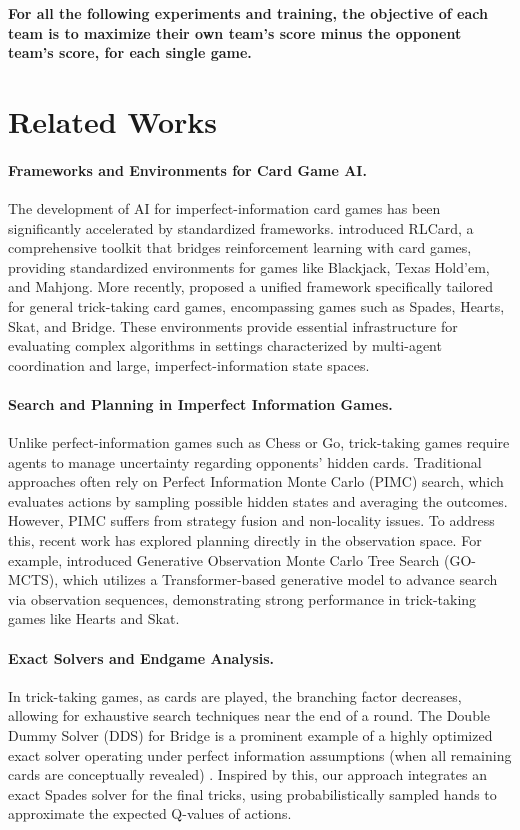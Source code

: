 \documentclass{article}
\begin{document}
\textbf{For all the following experiments and training, the objective of each team is to maximize their own team's score minus the opponent team's score, for each single game.}

\section{Related Works}

\paragraph{Frameworks and Environments for Card Game AI.} 
The development of AI for imperfect-information card games has been significantly accelerated by standardized frameworks. \citet{zha2019rlcard} introduced RLCard, a comprehensive toolkit that bridges reinforcement learning with card games, providing standardized environments for games like Blackjack, Texas Hold'em, and Mahjong. More recently, \citet{edelkamp2024framework} proposed a unified framework specifically tailored for general trick-taking card games, encompassing games such as Spades, Hearts, Skat, and Bridge. These environments provide essential infrastructure for evaluating complex algorithms in settings characterized by multi-agent coordination and large, imperfect-information state spaces.

\paragraph{Search and Planning in Imperfect Information Games.} 
Unlike perfect-information games such as Chess or Go, trick-taking games require agents to manage uncertainty regarding opponents' hidden cards. Traditional approaches often rely on Perfect Information Monte Carlo (PIMC) search, which evaluates actions by sampling possible hidden states and averaging the outcomes. However, PIMC suffers from strategy fusion and non-locality issues. To address this, recent work has explored planning directly in the observation space. For example, \citet{gottwald2024transformer} introduced Generative Observation Monte Carlo Tree Search (GO-MCTS), which utilizes a Transformer-based generative model to advance search via observation sequences, demonstrating strong performance in trick-taking games like Hearts and Skat. %

\paragraph{Exact Solvers and Endgame Analysis.} 
In trick-taking games, as cards are played, the branching factor decreases, allowing for exhaustive search techniques near the end of a round. The Double Dummy Solver (DDS) for Bridge is a prominent example of a highly optimized exact solver operating under perfect information assumptions (when all remaining cards are conceptually revealed) \citep{haglund2024dds}. Inspired by this, our approach integrates an exact Spades solver for the final tricks, using probabilistically sampled hands to approximate the expected Q-values of actions.
\end{document}
